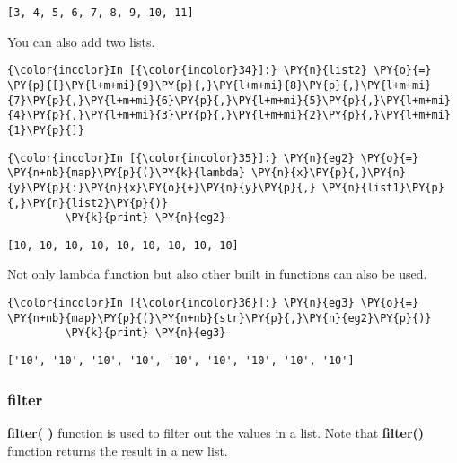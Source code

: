     \begin{Verbatim}[commandchars=\\\{\}]
[3, 4, 5, 6, 7, 8, 9, 10, 11]
    \end{Verbatim}

    You can also add two lists.

    \begin{Verbatim}[commandchars=\\\{\}]
{\color{incolor}In [{\color{incolor}34}]:} \PY{n}{list2} \PY{o}{=} \PY{p}{[}\PY{l+m+mi}{9}\PY{p}{,}\PY{l+m+mi}{8}\PY{p}{,}\PY{l+m+mi}{7}\PY{p}{,}\PY{l+m+mi}{6}\PY{p}{,}\PY{l+m+mi}{5}\PY{p}{,}\PY{l+m+mi}{4}\PY{p}{,}\PY{l+m+mi}{3}\PY{p}{,}\PY{l+m+mi}{2}\PY{p}{,}\PY{l+m+mi}{1}\PY{p}{]}
\end{Verbatim}

    \begin{Verbatim}[commandchars=\\\{\}]
{\color{incolor}In [{\color{incolor}35}]:} \PY{n}{eg2} \PY{o}{=} \PY{n+nb}{map}\PY{p}{(}\PY{k}{lambda} \PY{n}{x}\PY{p}{,}\PY{n}{y}\PY{p}{:}\PY{n}{x}\PY{o}{+}\PY{n}{y}\PY{p}{,} \PY{n}{list1}\PY{p}{,}\PY{n}{list2}\PY{p}{)}
         \PY{k}{print} \PY{n}{eg2}
\end{Verbatim}

    \begin{Verbatim}[commandchars=\\\{\}]
[10, 10, 10, 10, 10, 10, 10, 10, 10]
    \end{Verbatim}

    Not only lambda function but also other built in functions can also be
used.

    \begin{Verbatim}[commandchars=\\\{\}]
{\color{incolor}In [{\color{incolor}36}]:} \PY{n}{eg3} \PY{o}{=} \PY{n+nb}{map}\PY{p}{(}\PY{n+nb}{str}\PY{p}{,}\PY{n}{eg2}\PY{p}{)}
         \PY{k}{print} \PY{n}{eg3}
\end{Verbatim}

    \begin{Verbatim}[commandchars=\\\{\}]
['10', '10', '10', '10', '10', '10', '10', '10', '10']
    \end{Verbatim}

    \subsubsection{filter}\label{filter}

    \textbf{filter( )} function is used to filter out the values in a list.
Note that \textbf{filter()} function returns the result in a new list.

